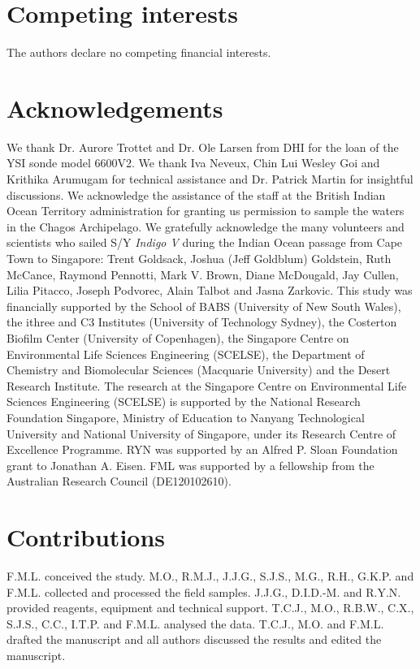 \begin{refsection}
\section{Competing interests}

The authors declare no competing financial interests.

\section{Acknowledgements}

We thank Dr. Aurore Trottet and Dr. Ole Larsen from DHI for the loan of the YSI sonde model 6600V2. We thank Iva Neveux, Chin Lui Wesley Goi and Krithika Arumugam for technical assistance and Dr. Patrick Martin for insightful discussions. We acknowledge the assistance of the staff at the British Indian Ocean Territory administration for granting us permission to sample the waters in the Chagos Archipelago. We gratefully acknowledge the many volunteers and scientists who sailed S/Y {\em Indigo V} during the Indian Ocean passage from Cape Town to Singapore: Trent Goldsack, Joshua (Jeff Goldblum) Goldstein, Ruth McCance, Raymond Pennotti, Mark V. Brown, Diane McDougald, Jay Cullen, Lilia Pitacco, Joseph Podvorec, Alain Talbot and Jasna Zarkovic. This study was financially supported by the School of BABS (University of New South Wales), the ithree and C3 Institutes (University of Technology Sydney), the Costerton Biofilm Center (University of Copenhagen), the Singapore Centre on Environmental Life Sciences Engineering (SCELSE), the Department of Chemistry and Biomolecular Sciences (Macquarie University) and the Desert Research Institute. The research at the Singapore Centre on Environmental Life Sciences Engineering (SCELSE) is supported by the National Research Foundation Singapore, Ministry of Education to Nanyang Technological University and National University of Singapore, under its Research Centre of Excellence Programme. RYN was supported by an Alfred P. Sloan Foundation grant to Jonathan A. Eisen. FML was supported by a fellowship from the Australian Research Council (DE120102610).

\section{Contributions}

F.M.L. conceived the study. M.O., R.M.J., J.J.G., S.J.S., M.G., R.H., G.K.P. and F.M.L. collected and processed the field samples. J.J.G., D.I.D.-M. and R.Y.N. provided reagents, equipment and technical support. T.C.J., M.O., R.B.W., C.X., S.J.S., C.C., I.T.P. and F.M.L. analysed the data. T.C.J., M.O. and F.M.L. drafted the manuscript and all authors discussed the results and edited the manuscript.

\printbibliography[heading=subbibliography]

\end{refsection}
